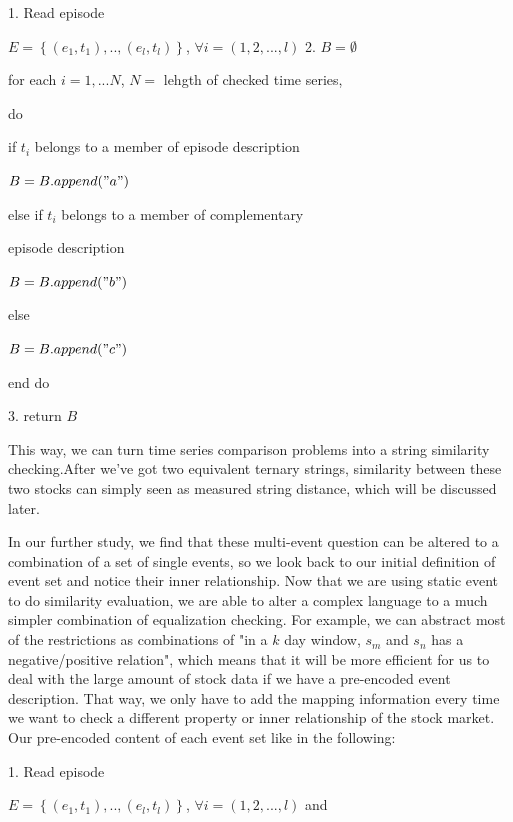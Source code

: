 \documentclass[10pt, conference, compsocconf]{IEEEtran}
\begin{document}
\par
\vspace{0.6mm}
1. Read episode 
\par\quad $E=\left \{ (e_{1},t_{1}),..,(e_{l},t_{l}) \right \}$, $\forall i=(1,2,...,l)$
2. $B=\emptyset$
\par\quad for each $i=1,...N$, $N=$ lehgth of checked time series, 
\par\quad do
\par\quad if $t_{i}$ belongs to a member of episode description
\par\quad $B=B.append("a")$
\par\quad else if $t_{i}$ belongs to a member of complementary 
\par\quad episode description
\par\quad $B=B.append("b")$
\par\quad else
\par\quad $B=B.append("c")$
\par\quad end do
\par
3. return $B$
\vspace{0.6mm}
\par
This way, we can turn time series comparison problems into a string similarity checking.After we've got two equivalent ternary strings, similarity between these two stocks can simply seen as measured string distance, which will be discussed later. \\
\par
In our further study, we find that these multi-event question can be altered to a combination of a set of single events, so we look back to our initial definition of event set and notice their inner relationship. Now that we are using static event to do similarity evaluation, we are able to alter a complex language to a much simpler combination of equalization checking. For example, we can abstract most of the restrictions as combinations of "in a $k$ day window, $s_{m}$ and $s_{n}$ has a negative/positive relation", which means that it will be more efficient for us to deal with the large amount of stock data if we have a pre-encoded event description. That way, we only have to add the mapping information every time we want to check a different property or inner relationship of the stock market. Our pre-encoded content of each event set like in the following:\\
\vspace{1.2mm}
\par
1. Read episode 
\par\quad $E=\left \{ (e_{1},t_{1}),..,(e_{l},t_{l}) \right \}$, $\forall i=(1,2,...,l)$ and
\end{document}
